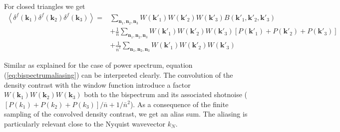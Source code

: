 \documentclass[a4paper,fleqn,usenatbib]{mnras}
\begin{document}
\begin{minipage}{1\columnwidth}
For closed triangles we get
\begin{align}
  \left\langle \delta^f(\mathbf{k}_1) \delta^f(\mathbf{k}_2) \delta^f(\mathbf{k}_3) \right\rangle =&
  \sum_{\mathbf{n}_1,\mathbf{n}_2,\mathbf{n}_3} 
  W(\mathbf{k'}_1) W(\mathbf{k'}_2) W(\mathbf{k'}_3) B(\mathbf{k'}_1,\mathbf{k'}_2,\mathbf{k'}_3) \nonumber\\
  & +\frac{1}{\bar{n}} \sum_{\mathbf{n}_1,\mathbf{n}_2,\mathbf{n}_3} 
  W(\mathbf{k'}_1) W(\mathbf{k'}_2) W(\mathbf{k'}_3) \left[P(\mathbf{k'}_1)+P(\mathbf{k'}_2)+P(\mathbf{k'}_3)\right]\nonumber\\
  &+\frac{1}{\bar{n}^2}\sum_{\mathbf{n}_1,\mathbf{n}_2,\mathbf{n}_3} W(\mathbf{k'}_1) W(\mathbf{k'}_2) W(\mathbf{k'}_3)
  \label{eq:bispectrumaliasing}
\end{align}
\end{minipage}


\twocolumn

\noindent Similar as \citep{Jing2005} explained for the case of power spectrum, 
equation (\ref{eq:bispectrumaliasing}) can be interpreted clearly. The 
convolution of the density contrast with the window function introduce a factor 
$W(\mathbf{k}_1) W(\mathbf{k}_2) W(\mathbf{k}_3)$ both to the bispectrum and 
its associated shotnoise ($[P(k_1)+P(k_2)+P(k_3)]/\bar{n} + 1/\bar{n}^2$). As a 
consequence of the finite sampling of the convolved density contrast, we get an 
alias sum. The aliasing is particularly relevant close to the Nyquist wavevector 
$k_N$. %

\end{document}
